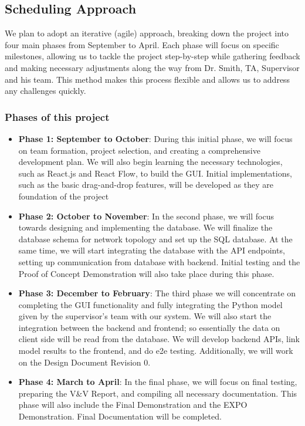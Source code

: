 \documentclass{article}
\begin{document}
\subsection{Scheduling Approach}
We plan to adopt an iterative (agile) approach, breaking down the project into four main phases from September to April. Each phase will focus on specific milestones, allowing us to tackle the project step-by-step while gathering feedback and making necessary adjustments along the way from Dr. Smith, TA, Supervisor and his team. This method makes this process flexible and allows us to address any challenges quickly. 

\subsubsection{Phases of this project}

\begin{itemize}
    \item \textbf{Phase 1: September to October}: During this initial phase, we will focus on team formation, project selection, and creating a comprehensive development plan. We will also begin learning the necessary technologies, such as React.js and React Flow, to build the GUI. Initial implementations, such as the basic drag-and-drop features, will be developed as they are foundation of the project

    \item \textbf{Phase 2: October to November}: In the second phase, we will focus towards designing and implementing the database. We will finalize the database schema for network topology and set up the SQL database. At the same time, we will start integrating the database with the API endpoints, setting up communication from database with backend. Initial testing and the Proof of Concept Demonstration will also take place during this phase.

    \item \textbf{Phase 3: December to February}: The third phase we will concentrate on completing the GUI functionality and fully integrating the Python model given by the supervisor's team with our system. We will also start the integration between the backend and frontend; so essentially the data on client side will be read from the database. We will develop backend APIs, link model results to the frontend, and do e2e testing. Additionally, we will work on the Design Document Revision 0.

    \item \textbf{Phase 4: March to April}: In the final phase, we will focus on final testing, preparing the V\&V Report, and compiling all necessary documentation. This phase will also include the Final Demonstration and the EXPO Demonstration. Final Documentation will be completed.
\end{itemize}
\end{document}
